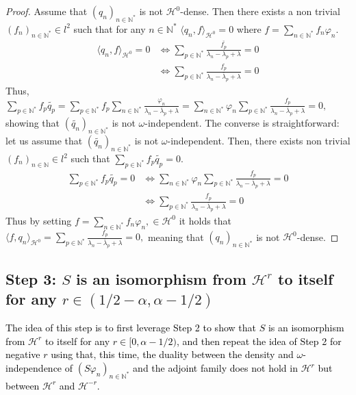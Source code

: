 \documentclass[11pt, dvipsnames]{amsart}
\begin{document}
\begin{proof}
    Assume that $(q_n)_{n\in\mathbb{N}^*}$ is not ${\mathcal{H}^0}$-dense. Then there exists a non trivial $(f_n)_{n\in \mathbb{N}^*}\in l^{2}$ such that for any $n\in\mathbb{N}^*$ $\langle q_n,f\rangle_{\mathcal{H}^0}=0$ where $f=\displaystyle\sum_{n\in \mathbb{N}^*}f_n \varphi_n.$
    \begin{align*}
        \langle q_n,f\rangle_{\mathcal{H}^0}=0&\Leftrightarrow \sum_{p\in \mathbb{N}^*}\frac{\overline{f_p}}{\lambda_n-\lambda_p+\lambda}=0\\
        &\Leftrightarrow \sum_{p\in \mathbb{N}^*}\frac{f_p}{\overline{\lambda_n-\lambda_p+\lambda}}=0
    \end{align*}
Thus, $\displaystyle\sum_{p\in \mathbb{N}^*}f_p \widetilde{q_p}=\displaystyle\sum_{p\in \mathbb{N}^*}f_p\displaystyle\sum_{n\in \mathbb{N}^*}\frac{\varphi_n}{\overline{\lambda_n-\lambda_p+\lambda}}=\displaystyle\sum_{n\in \mathbb{N}^*}\varphi_n\displaystyle\sum_{p\in \mathbb{N}^*}\frac{f_p}{\overline{\lambda_n-\lambda_p+\lambda}}=0,$ showing that $(\widetilde{q_n})_{n\in\mathbb{N}^*}$ is not $\omega$-independent.
The converse is straightforward: let us assume that $(\widetilde{q_n})_{n\in\mathbb{N}^*}$ is not $\omega$-independent. Then, there exists non trivial $(f_n)_{n\in \mathbb{N}}\in l^{2}$ such that $\displaystyle\sum_{p\in \mathbb{N}^*} f_p \widetilde{q_p}=0$.
\begin{align*}
  \sum_{p\in \mathbb{N}^*} f_p \widetilde{q_p}=0
  &\Leftrightarrow\sum_{n\in \mathbb{N}^*}\varphi_n\sum_{p\in \mathbb{N}^*}\frac{ f_p}{\overline{\lambda_n-\lambda_p+\lambda}}=0\\
  &\Leftrightarrow \sum_{p\in \mathbb{N}^*}\frac{ f_p}{\overline{\lambda_n-\lambda_p+\lambda}}=0
\end{align*} Thus by setting $f=\sum_{n\in \mathbb{N}^*} f_n \varphi_n,\in {\mathcal{H}^0}$ it holds that
$\langle f,q_n\rangle_{\mathcal{H}^0}=\sum_{p\in \mathbb{N}^*}\frac{ f_p}{\overline{\lambda_n-\lambda_p+\lambda}}=0,$ 
meaning that $(q_n)_{n\in\mathbb{N}^*}$ is not ${\mathcal{H}^0}$-dense. 
\end{proof}

\subsection{Step 3: $S$ is an isomorphism from $\mathcal{H}^{r}$ to itself for any $r\in(1/2-\alpha,\alpha-1/2)$}
\label{sec:step3}

\textcolor{black}{The idea of this step is to first leverage Step 2 to show that $S$ is an isomorphism from $\mathcal{H}^{r}$ to itself for any $r\in[0,\alpha-1/2)$, and then repeat the idea of Step 2 for negative $r$ using that, this time, the duality between the density and $\omega$-independence of $(S\varphi_{n})_{n\in\mathbb{N}^{*}}$ and the adjoint family does not hold in $\mathcal{H}^{r}$ but between $\mathcal{H}^{r}$ and $\mathcal{H}^{-r}$.}\\
\end{document}
